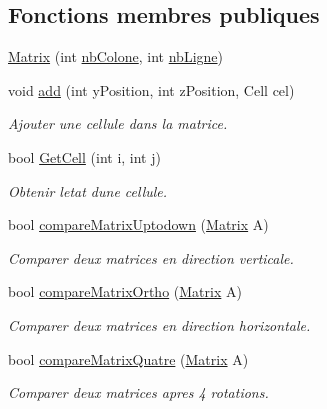 \subsection*{Fonctions membres publiques}
\begin{DoxyCompactItemize}
\item 
\mbox{\hyperlink{class_matrix_a7fc9206cb63f27154b47f5a4d7e413f0}{Matrix}} (int \mbox{\hyperlink{class_matrix_a4b79d8649f64d752e88114a86dc6a91b}{nb\+Colone}}, int \mbox{\hyperlink{class_matrix_ac6dd4dae973f7c67ae6fd6c2938d9ac5}{nb\+Ligne}})
\item 
void \mbox{\hyperlink{class_matrix_aa3ca21c6dd7c9a3b69d53e35c4cdebf3}{add}} (int y\+Position, int z\+Position, Cell cel)
\begin{DoxyCompactList}\small\item\em Ajouter une cellule dans la matrice. \end{DoxyCompactList}\item 
bool \mbox{\hyperlink{class_matrix_aeb46ec5d650af142b30d0fd11f6895c3}{Get\+Cell}} (int i, int j)
\begin{DoxyCompactList}\small\item\em Obtenir l\textquotesingle{}etat d\textquotesingle{}une cellule. \end{DoxyCompactList}\item 
bool \mbox{\hyperlink{class_matrix_af7b27f62f9cc10b69fd583dea958573f}{compare\+Matrix\+Uptodown}} (\mbox{\hyperlink{class_matrix}{Matrix}} A)
\begin{DoxyCompactList}\small\item\em Comparer deux matrices en direction verticale. \end{DoxyCompactList}\item 
bool \mbox{\hyperlink{class_matrix_a7cf375802501629eb82697c090c03383}{compare\+Matrix\+Ortho}} (\mbox{\hyperlink{class_matrix}{Matrix}} A)
\begin{DoxyCompactList}\small\item\em Comparer deux matrices en direction horizontale. \end{DoxyCompactList}\item 
bool \mbox{\hyperlink{class_matrix_adfbbe521a0688e507a05f5590daf9ea4}{compare\+Matrix\+Quatre}} (\mbox{\hyperlink{class_matrix}{Matrix}} A)
\begin{DoxyCompactList}\small\item\em Comparer deux matrices apres 4 rotations. \end{DoxyCompactList}\end{DoxyCompactItemize}
